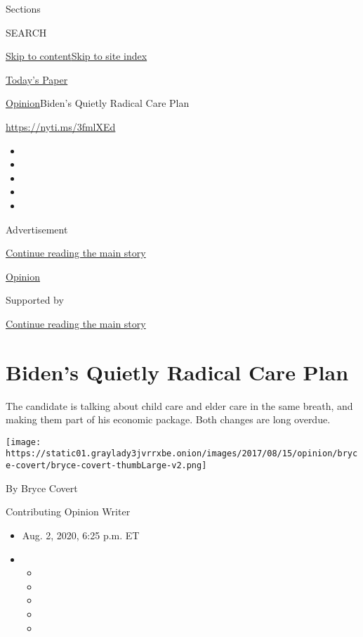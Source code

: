 Sections

SEARCH

\protect\hyperlink{site-content}{Skip to
content}\protect\hyperlink{site-index}{Skip to site index}

\href{https://myaccount.nytimes3xbfgragh.onion/auth/login?response_type=cookie\&client_id=vi}{}

\href{https://www.nytimes3xbfgragh.onion/section/todayspaper}{Today's
Paper}

\href{/section/opinion}{Opinion}\textbar{}Biden's Quietly Radical Care
Plan

\url{https://nyti.ms/3fmlXEd}

\begin{itemize}
\item
\item
\item
\item
\item
\end{itemize}

Advertisement

\protect\hyperlink{after-top}{Continue reading the main story}

\href{/section/opinion}{Opinion}

Supported by

\protect\hyperlink{after-sponsor}{Continue reading the main story}

\hypertarget{bidens-quietly-radical-care-plan}{%
\section{Biden's Quietly Radical Care
Plan}\label{bidens-quietly-radical-care-plan}}

The candidate is talking about child care and elder care in the same
breath, and making them part of his economic package. Both changes are
long overdue.

\texttt{[image: https://static01.graylady3jvrrxbe.onion/images/2017/08/15/opinion/bryce-covert/bryce-covert-thumbLarge-v2.png]}

By Bryce Covert

Contributing Opinion Writer

\begin{itemize}
\item
  Aug. 2, 2020, 6:25 p.m. ET
\item
  \begin{itemize}
  \item
  \item
  \item
  \item
  \item
  \end{itemize}
\end{itemize}

